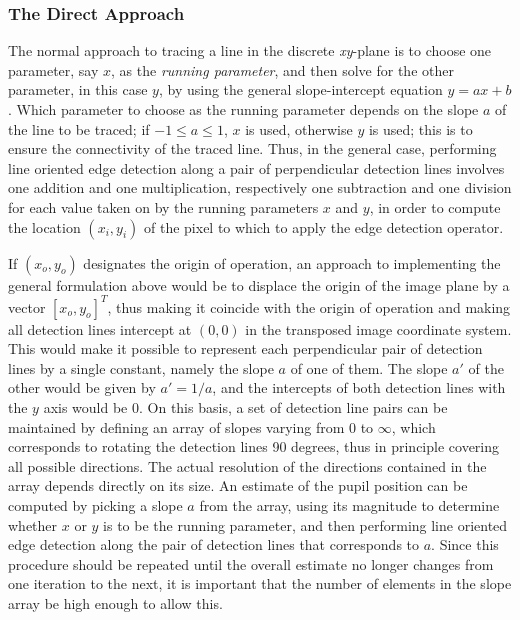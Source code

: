 \subsubsection{The Direct Approach}

The normal approach to tracing a line in the discrete {\em xy\/}-plane
is to choose one parameter, say $x$, as the {\em running parameter\/},
and then solve for the other parameter, in this case $y$, by using the
general slope-intercept equation $y=ax+b$.  Which parameter to choose
as the running parameter depends on the slope $a$ of the line to be
traced; if $-1\leq a\leq 1$, $x$ is used, otherwise $y$ is used; this
is to ensure the connectivity of the traced line.  Thus, in the
general case, performing line oriented edge detection along a pair of
perpendicular detection lines involves one addition and one
multiplication, respectively one subtraction and one division for each
value taken on by the running parameters $x$ and $y$, in order to
compute the location $(x_{i},y_{i})$ of the pixel to which to apply
the edge detection operator.

If $(x_{o},y_{o})$ designates the origin of operation, an approach to
implementing the general formulation above would be to displace the
origin of the image plane by a vector $[x_{o},y_{o}]^{T}$, thus making
it coincide with the origin of operation and making all detection
lines intercept at $(0,0)$ in the transposed image coordinate system.
This would make it possible to represent each perpendicular pair of
detection lines by a single constant, namely the slope $a$ of one of
them.  The slope $a'$ of the other would be given by $a'=1/a$, and the
intercepts of both detection lines with the $y$ axis would be 0.  On
this basis, a set of detection line pairs can be maintained by
defining an array of slopes varying from 0 to $\infty$, which
corresponds to rotating the detection lines 90 degrees, thus in
principle covering all possible directions.  The actual resolution of
the directions contained in the array depends directly on its size.
An estimate of the pupil position can be computed by picking a slope
$a$ from the array, using its magnitude to determine whether $x$ or
$y$ is to be the running parameter, and then performing line oriented
edge detection along the pair of detection lines that corresponds to
$a$.  Since this procedure should be repeated until the overall
estimate no longer changes from one iteration to the next, it is
important that the number of elements in the slope array be high
enough to allow this.

